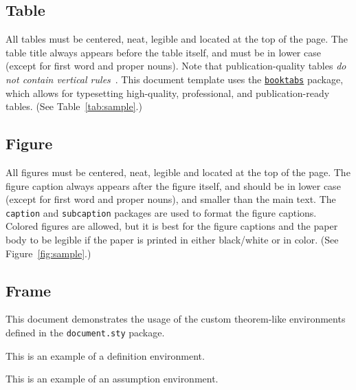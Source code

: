   
\subsection{Table}

All tables must be centered, neat, legible and located at the top of the page.
The table title always appears before the table itself, and must be in lower case (except for first word and proper nouns).
Note that publication-quality tables \emph{do not contain vertical rules}~\autocite{neurips2023template}. 
This document template uses the \href{https://www.ctan.org/pkg/booktabs}{\Verb|booktabs|} package, which allows for typesetting high-quality, professional, and publication-ready tables. 
(See Table~\ref{tab:sample}.)


\subsection{Figure}

All figures must be centered, neat, legible and located at the top of the page. 
The figure caption always appears after the figure itself, and should be in lower case (except for first word and proper nouns), and smaller than the main text. 
The \Verb|caption| and \Verb|subcaption| packages are used to format the figure captions.
Colored figures are allowed, but it is best for the figure captions and the paper body to be legible if the paper is printed in either black/white or in color.
(See Figure~\ref{fig:sample}.)


\subsection{Frame}

This document demonstrates the usage of the custom theorem-like environments defined in the \texttt{document.sty} package.

\begin{definition}
  This is an example of a definition environment.
\end{definition}

\begin{assumption}
  This is an example of an assumption environment.
\end{assumption}

